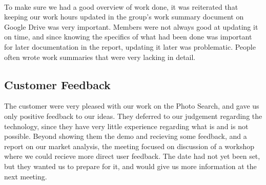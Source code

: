 \paragraph{} To make sure we had a good overview of work done, it was reiterated that keeping our work hours updated in the group's work summary document on Google Drive was very important. Members were not always good at updating it on time, and since knowing the specifics of what had been done was important for later documentation in the report, updating it later was problematic. People often wrote work summaries that were very lacking in detail.

\subsection{Customer Feedback}
\label{subsec:S1RetrospectiveCustomerFeedback}
The customer were very pleased with our work on the Photo Search, and gave us only positive feedback to our ideas. They deferred to our judgement regarding the technology, since they have very little experience regarding what is and is not possible. Beyond showing them the demo and recieving some feedback, and a report on our market analysis, the meeting focused on discussion of a workshop where we could recieve more direct user feedback. The date had not yet been set, but they wanted us to prepare for it, and would give us more information at the next meeting.